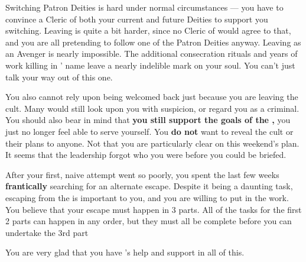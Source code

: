 \documentclass[green]{GL2020}
\begin{document}
\name{\gEscapingFoG{}}

Switching Patron Deities is hard under normal circumstances — you have to convince a Cleric of both your current and future Deities to support you switching. Leaving \cGenesis{} is quite a bit harder, since no Cleric of \cGenesis{} would agree to that, and you are all pretending to follow one of the Patron Deities anyway. Leaving \cGenesis{} as an Avenger is nearly impossible. The additional consecration rituals and years of work killing in \cGenesis{}’ name leave a nearly indelible mark on your soul. You can’t just talk your way out of this one.

You also cannot rely upon being welcomed back just because you are leaving the cult. Many would still look upon you with suspicion, or regard you as a criminal. You should also bear in mind that \textbf{you still support the goals of the \pGoaties{},} you just no longer feel able to serve yourself. You \textbf{do not} want to reveal the cult or their plans to anyone. Not that you are particularly clear on this weekend's plan. It seems that the leadership forgot who you were before you could be briefed.

After your first, naive attempt went so poorly, you spent the last few weeks \textbf{frantically} searching for an alternate escape. Despite it being a daunting task, escaping from the \pGoaties{} is important to you, and you are willing to put in the work. You believe that your escape must happen in 3 parts. All of the tasks for the first 2 parts can happen in any order, but they must all be complete before you can undertake the 3rd part

You are very glad that you have \cLibrarian{\full}’s help and support in all of this.
\end{document}
